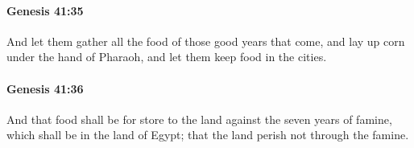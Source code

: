 		\paragraph{Genesis 41:35} %
			\label{GENESIS-41-35}

			And let them gather all the food of those good years that come, and lay up corn under the hand of Pharaoh, and let them keep food in the cities.


		\paragraph{Genesis 41:36} %
			\label{GENESIS-41-36}

			And that food shall be for store to the land against the seven years of famine, which shall be in the land of Egypt; that the land perish not through the famine.


